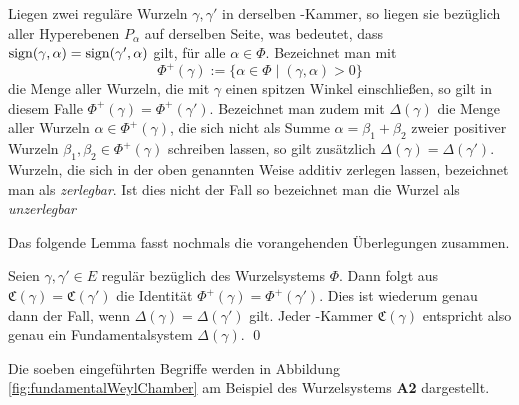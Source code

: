 Liegen zwei reguläre Wurzeln $\gamma, \gamma'$ in derselben \weyl\hyp{}Kammer, so liegen sie bezüglich aller Hyperebenen $P_\alpha$ auf derselben Seite, was bedeutet, dass $\operatorname{sign} (\gamma, \alpha) = \operatorname{sign}( \gamma', \alpha)$ gilt, für alle $\alpha \in \Phi$.
Bezeichnet man mit
\begin{displaymath}
  \Phi^+(\gamma) := \{ \alpha \in \Phi \mid (\gamma, \alpha) > 0 \}
\end{displaymath}
die Menge aller Wurzeln, die mit $\gamma$ einen spitzen Winkel einschließen, so gilt in diesem Falle $\Phi^+(\gamma) = \Phi^+(\gamma')$.
Bezeichnet man zudem mit $\Delta(\gamma)$ die Menge aller Wurzeln $\alpha \in \Phi^+(\gamma)$, die sich nicht als Summe $\alpha = \beta_1 + \beta_2$ zweier positiver Wurzeln $\beta_1, \beta_2 \in \Phi^+(\gamma)$ schreiben lassen, so gilt zusätzlich $\Delta(\gamma) = \Delta(\gamma')$. 
Wurzeln, die sich in der oben genannten Weise additiv zerlegen lassen, bezeichnet man als \emph{zerlegbar}. 
Ist dies nicht der Fall so bezeichnet man die Wurzel als \emph{unzerlegbar}

Das folgende Lemma fasst nochmals die vorangehenden Überlegungen zusammen.

\begin{lem}
  Seien $\gamma, \gamma' \in E$ regulär bezüglich des Wurzelsystems $\Phi$.
  Dann folgt aus $\mathfrak{C}(\gamma) = \mathfrak{C}(\gamma')$ die Identität $\Phi^+(\gamma) = \Phi^+(\gamma')$. 
  Dies ist wiederum genau dann der Fall, wenn $\Delta(\gamma) = \Delta(\gamma')$ gilt.
  Jeder \weyl\hyp{}Kammer $\mathfrak{C}(\gamma)$ entspricht also genau ein Fundamentalsystem $\Delta(\gamma)$. \qed
\end{lem}

Die soeben eingeführten Begriffe werden in Abbildung \ref{fig:fundamentalWeylChamber} am Beispiel des Wurzelsystems \textbf{A2} dargestellt.


